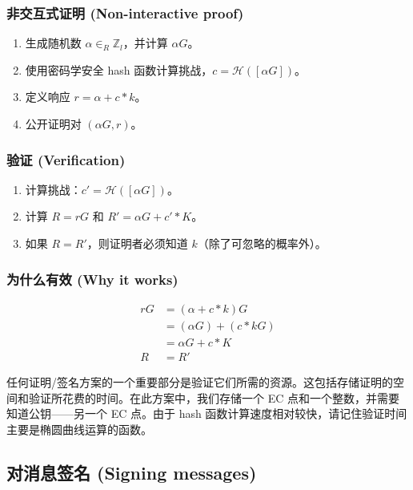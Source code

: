\subsubsection*{非交互式证明 (Non-interactive proof)}

\begin{enumerate}
	\item 生成随机数 $\alpha \in_R \mathbb{Z}_l$，并计算 $\alpha G$。
	\item 使用密码学安全 hash 函数计算挑战，\(c = \mathcal{H}([\alpha G])\)。
	\item 定义响应 $r = \alpha + c*k$。
	\item 公开证明对 $(\alpha G, r)$。
\end{enumerate}

\subsubsection*{验证 (Verification)}

\begin{enumerate}
	\item 计算挑战：\(c' = \mathcal{H}([\alpha G])\)。
	\item 计算 $R = r G$ 和 $R' = \alpha G + c'*K$。
	\item 如果 $R = R'$，则证明者必须知道 $k$（除了可忽略的概率外）。
\end{enumerate}

\subsubsection*{为什么有效 (Why it works)}

\begin{align*}
r G &= (\alpha + c*k) G \\
	&= (\alpha G) + (c*k G) \\
	&= \alpha G + c*K \\
  R &= R'
\end{align*}

任何证明/签名方案的一个重要部分是验证它们所需的资源。这包括存储证明的空间和验证所花费的时间。在此方案中，我们存储一个 EC 点和一个整数，并需要知道公钥——另一个 EC 点。由于 hash 函数计算速度相对较快，请记住验证时间主要是椭圆曲线运算的函数。


\subsection{对消息签名 (Signing messages)}
\label{sec:signing-messages}

